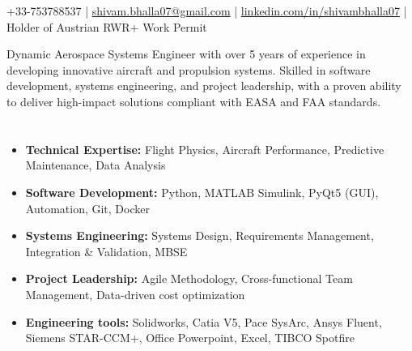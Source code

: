 \documentclass[9pt]{article}        %
\begin{document}
\centerline{%
  \selectfont\textbf{%
    {\fontsize{20.74}{25}\selectfont{}}%
    {\fontsize{14.4}{18}\selectfont{}}%
    \hspace{0.5em}%
    {\fontsize{20.74}{25}\selectfont{}}%
    {\fontsize{14.4}{18}\selectfont{}}%
  }%
}
\vspace{+2pt}

\centerline{ +33-753788537 | \href{mailto:shivam.bhalla07@gmail.com}{shivam.bhalla07@gmail.com} | \href{https://www.linkedin.com/in/shivambhalla07/}{linkedin.com/in/shivambhalla07} | Holder of Austrian RWR+ Work Permit }

\vspace{+12pt} %

Dynamic Aerospace Systems Engineer with over 5 years of experience in developing innovative aircraft and propulsion systems. Skilled in software development, systems engineering, and project leadership, with a proven ability to deliver high-impact solutions compliant with EASA and FAA standards.

\section*{{\fontsize{12}{14.4}\selectfont{}}{\fontsize{9}{10.8}\selectfont{}}}
\begin{itemize}
\item \textbf{Technical Expertise:} Flight Physics, Aircraft Performance, Predictive Maintenance, Data Analysis
\item \textbf{Software Development:} Python, MATLAB Simulink, PyQt5 (GUI), Automation, Git, Docker
\item \textbf{Systems Engineering:} Systems Design, Requirements Management, Integration \& Validation, MBSE
\item \textbf{Project Leadership:} Agile Methodology, Cross-functional Team Management, Data-driven cost optimization
\item \textbf{Engineering tools:} Solidworks, Catia V5, Pace SysArc, Ansys Fluent, Siemens STAR-CCM+, Office Powerpoint, Excel, TIBCO Spotfire
\end{itemize}
\end{document}
